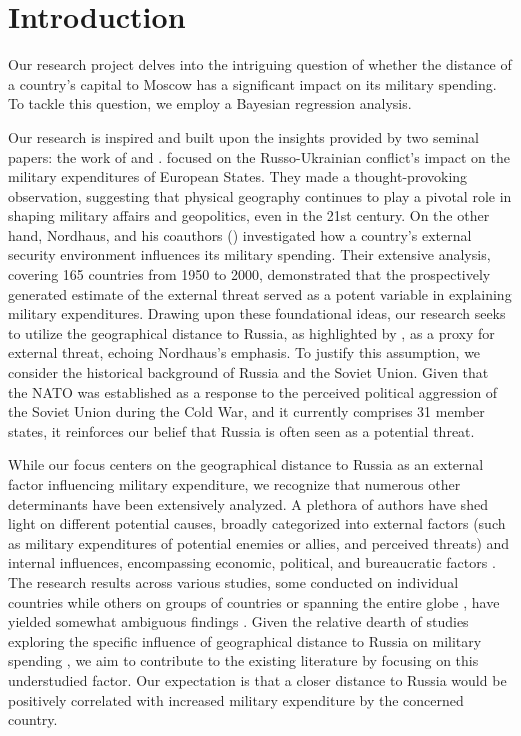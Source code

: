\documentclass[12pt,a4paper]{article}
\begin{document}
\section{Introduction}
Our research project delves into the intriguing question of whether the distance of a country's capital to Moscow has a significant impact on its military spending. To tackle this question, we employ a Bayesian regression analysis.

Our research is inspired and built upon the insights provided by two seminal papers: the work of \citet{kofrovn2023} and \citet{nordhaus2012}. \citet{kofrovn2023} focused on the Russo-Ukrainian conflict's impact on the military expenditures of European States. They made a thought-provoking observation, suggesting that physical geography continues to play a pivotal role in shaping military affairs and geopolitics, even in the 21st century. On the other hand, Nordhaus, and his coauthors (\citeyear{nordhaus2012}) investigated how a country's external security environment influences its military spending. Their extensive analysis, covering 165 countries from 1950 to 2000, demonstrated that the prospectively generated estimate of the external threat served as a potent variable in explaining military expenditures. Drawing upon these foundational ideas, our research seeks to utilize the geographical distance to Russia, as highlighted by \citet{kofrovn2023}, as a proxy for external threat, echoing Nordhaus's emphasis. To justify this assumption, we consider the historical background of Russia and the Soviet Union. Given that the NATO was established as a response to the perceived political aggression of the Soviet Union during the Cold War, and it currently comprises 31 member states, it reinforces our belief that Russia is often seen as a potential threat.

While our focus centers on the geographical distance to Russia as an external factor influencing military expenditure, we recognize that numerous other determinants have been extensively analyzed. A plethora of authors have shed light on different potential causes, broadly categorized into external factors (such as military expenditures of potential enemies or allies, and perceived threats) and internal influences, encompassing economic, political, and bureaucratic factors \citep{nikolaidou2008}. The research results across various studies, some conducted on individual countries while others on groups of countries or spanning the entire globe \citep{nikolaidou2008,george2018,nordhaus2012}, have yielded somewhat ambiguous findings \citep{nikolaidou2008,odehnal2020}. 
Given the relative dearth of studies exploring the specific influence of geographical distance to Russia on military spending \citep{kofrovn2023}, we aim to contribute to the existing literature by focusing on this understudied factor. Our expectation is that a closer distance to Russia would be positively correlated with increased military expenditure by the concerned country.  
\end{document}
